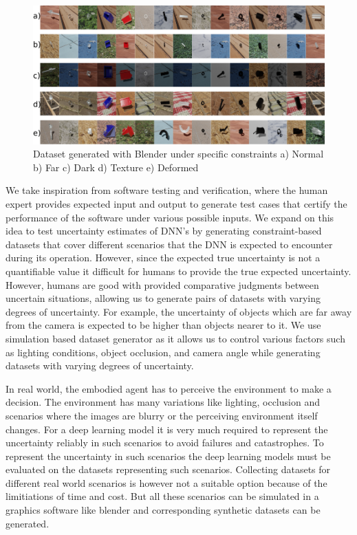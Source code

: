 \begin{figure}[t]
	\centering
	\includegraphics[width = \textwidth]{images/dataset_generation_v3.png}
	\caption{Dataset generated with Blender under specific constraints a) Normal b) Far c) Dark d) Texture e) Deformed}
	\label{fig:constraint_based_dataset_generation}
\end{figure}

We take inspiration from software testing and verification,
where the human expert provides expected input and output to generate test cases
that certify the performance of the software under various possible inputs. We expand on
this idea to test uncertainty estimates of DNN's by generating
constraint-based datasets that cover different scenarios that the DNN is
expected to encounter during its operation. However, since the expected
true uncertainty is not a quantifiable value it difficult for humans to
provide the true expected uncertainty. However, humans are good with
provided comparative judgments between uncertain situations, allowing us
to generate pairs of datasets with varying degrees of uncertainty. For
example, the uncertainty of objects which are far away from the camera
is expected to be higher than objects nearer to it. We use simulation
based dataset generator as it allows us to control various factors such
as lighting conditions, object occlusion, and camera angle while
generating datasets with varying degrees of uncertainty.


In real world, the embodied agent has to perceive the environment to make a decision. The environment has many variations like lighting, occlusion and scenarios where the images are blurry or the perceiving environment itself changes. For a deep learning model it is very much required to represent the uncertainty reliably in such scenarios to avoid failures and catastrophes. To represent the uncertainty in such scenarios the deep learning models must be evaluated on the datasets representing such scenarios. Collecting datasets for different real world scenarios is however not a suitable option because of the limitiations of time and cost. But all these scenarios can be simulated in a graphics software like blender and corresponding synthetic datasets can be generated.

